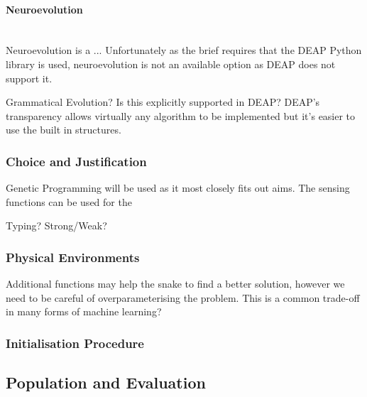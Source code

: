 \documentclass{article}
\newcommand{\myparagraph}[1]{\paragraph{#1}\mbox{}\\}
\begin{document}
\myparagraph{Neuroevolution}
Neuroevolution is a ... %
Unfortunately as the brief requires that the DEAP Python library is used, neuroevolution is not an available option as DEAP does not support it.

Grammatical Evolution? Is this explicitly supported in DEAP?\cite{deap}
DEAP's transparency allows virtually any algorithm to be implemented but it's easier to use the built in structures.



\subsubsection{Choice and Justification}
Genetic Programming will be used as it most closely fits out aims. The sensing functions can be used for the 

Typing? Strong/Weak?


\subsubsection{Physical Environments}

Additional functions may help the snake to find a better solution, however we need to be careful of overparameterising the problem.
This is a common trade-off in many forms of machine learning?

\subsubsection{Initialisation Procedure}

\subsection{Population and Evaluation}
\end{document}
